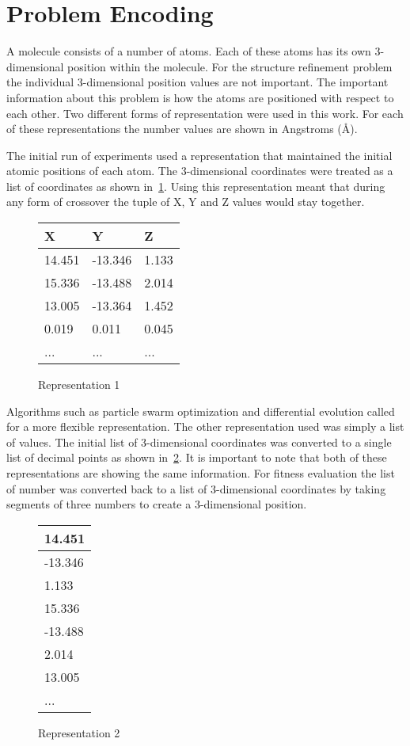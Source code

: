 \section{Problem Encoding}

A molecule consists of a number of atoms. Each of these atoms has its own 3-dimensional position within the molecule. For the structure refinement problem the individual 3-dimensional position values are not important. The important information about this problem is how the atoms are positioned with respect to each other. Two different forms of representation were used in this work. For each of these representations the number values are shown in Angstroms (\AA).

The initial run of experiments used a representation that maintained the initial atomic positions of each atom. The 3-dimensional coordinates were treated as a list of coordinates as shown in~\ref{fig:representation1}. Using this representation meant that during any form of crossover the tuple of X, Y and Z values would stay together.

\begin{figure}
	\centering
	\begin{tabular}{ | l | l | l | }
		\hline
		X & Y & Z \\ \hline
		14.451 & -13.346 & 1.133 \\ \hline
		15.336 & -13.488 & 2.014 \\ \hline
		13.005 & -13.364 & 1.452 \\ \hline
		0.019 & 0.011 & 0.045 \\ \hline
		... & ... & ... \\ \hline
	\end{tabular}
	\caption{Representation 1}
	\label{fig:representation1}
\end{figure}

Algorithms such as particle swarm optimization and differential evolution called for a more flexible representation. The other representation used was simply a list of values. The initial list of 3-dimensional coordinates was converted to a single list of decimal points as shown in~\ref{fig:representation2}. It is important to note that both of these representations are showing the same information. For fitness evaluation the list of number was converted back to a list of 3-dimensional coordinates by taking segments of three numbers to create a 3-dimensional position.

\begin{figure}
	\centering
	\begin{tabular}{ | l | }
		\hline
		14.451 \\ \hline
		-13.346 \\ \hline
		1.133 \\ \hline
		15.336 \\ \hline
		-13.488 \\ \hline
		2.014 \\ \hline
		13.005 \\ \hline
		... \\ \hline
	\end{tabular}
	\caption{Representation 2}
	\label{fig:representation2}
\end{figure}